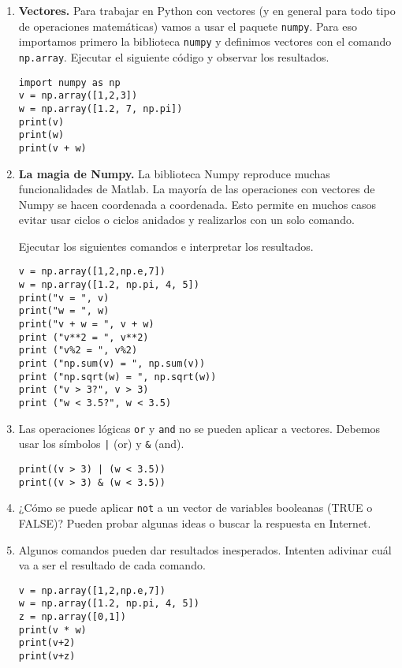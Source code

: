 \documentclass[a4paper,11pt]{article}
\theoremstyle{definition}
\begin{document}
\begin{enumerate}
\item \textbf{Vectores.}
Para trabajar  en Python con vectores (y en general para todo tipo de operaciones matemáticas) vamos a usar el paquete \lstinline{numpy}. Para eso importamos primero la biblioteca \lstinline{numpy} y definimos vectores con el comando \lstinline{np.array}. Ejecutar el siguiente c\'odigo y observar los resultados.

\begin{lstlisting}
import numpy as np
v = np.array([1,2,3])
w = np.array([1.2, 7, np.pi])
print(v)
print(w)
print(v + w)
\end{lstlisting}

\item \textbf{La magia de Numpy.} La biblioteca Numpy reproduce muchas funcionalidades de Matlab. La mayor\'ia de las operaciones con vectores de Numpy se hacen coordenada a coordenada. Esto permite en muchos casos evitar usar ciclos o ciclos anidados y realizarlos con un solo comando.

Ejecutar los siguientes comandos e interpretar los resultados.

\begin{lstlisting}
v = np.array([1,2,np.e,7])
w = np.array([1.2, np.pi, 4, 5])
print("v = ", v)
print("w = ", w)
print("v + w = ", v + w)
print ("v**2 = ", v**2)
print ("v%2 = ", v%2)
print ("np.sum(v) = ", np.sum(v))
print ("np.sqrt(w) = ", np.sqrt(w))
print ("v > 3?", v > 3)
print ("w < 3.5?", w < 3.5)
\end{lstlisting}

\item Las operaciones l\'ogicas \lstinline{or} y \lstinline{and} no se pueden aplicar a vectores. Debemos usar los s\'imbolos \lstinline{|} (or) y \lstinline{&} (and).
\begin{lstlisting}
print((v > 3) | (w < 3.5))
print((v > 3) & (w < 3.5))
\end{lstlisting}

\item ¿C\'omo se puede aplicar \lstinline{not} a un vector de variables booleanas (TRUE o FALSE)? Pueden probar algunas ideas o buscar la respuesta en Internet.

\item Algunos comandos pueden dar resultados inesperados. Intenten adivinar cuál va a ser el resultado de cada comando.
\begin{lstlisting}
v = np.array([1,2,np.e,7])
w = np.array([1.2, np.pi, 4, 5])
z = np.array([0,1])
print(v * w)
print(v+2)
print(v+z)
\end{lstlisting}


\end{enumerate}
\end{document}

